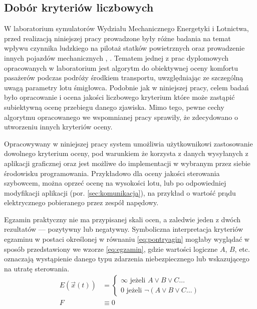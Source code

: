 \subsection{Dobór kryteriów liczbowych}
\label{sec:dobor-kryteriow}
W laboratorium symulatorów Wydziału Mechanicznego Energetyki i Lotnictwa, przed realizacją niniejszej pracy prowadzone były różne badania na temat wpływu czynnika ludzkiego na pilotaż statków powietrznych oraz prowadzenie innych pojazdów mechanicznych \cite{kopyt2017}, \cite{kopyt2019}. Tematem jednej z prac dyplomowych opracowanych w laboratorium \cite{tomaszewska2019} jest algorytm do obiektywnej oceny komfortu pasażerów podczas podróży środkiem transportu, uwzględniając ze szczególną uwagą parametry lotu śmigłowca. Podobnie jak w niniejszej pracy, celem badań było opracowanie i ocena jakości liczbowego kryterium które może zastąpić subiektywną ocenę przebiegu danego zjawiska. Mimo tego, pewne cechy algorytmu opracowanego we wspomnianej pracy sprawiły, że zdecydowano o utworzeniu innych kryteriów oceny.

Opracowywany w niniejszej pracy system umożliwia użytkownikowi zastosowanie dowolnego kryterium oceny, pod warunkiem że korzysta z  danych wysyłanych z aplikacji graficznej oraz jest możliwe do implementacji w wybranym przez siebie środowisku programowania. Przykładowo dla oceny jakości sterowania szybowcem, można oprzeć ocenę na wysokości lotu, lub po odpowiedniej modyfikacji aplikacji (por. \ref{sec:komunikacja}), na przykład o wartość prądu elektrycznego pobieranego przez zespół napędowy.

Egzamin praktyczny nie ma przypisanej skali ocen, a zaledwie jeden z dwóch rezultatów --- pozytywny lub negatywny. Symboliczna interpretacja kryteriów egzaminu w postaci określonej w równaniu \ref{eq:pontryagin} mogłaby wyglądać w sposób przedstawiony we wzorze \ref{eq:egzamin}, gdzie wartości logiczne $ A $, $ B $, etc. oznaczają wystąpienie danego typu zdarzenia niebezpiecznego lub wskazującego na utratę sterowania.
\begin{align}
    \label{eq:egzamin}
    E\left( \vec{x}(t) \right) &=
    \left\{
        \begin{array}{ll}
            \infty \mbox{ jeżeli } A \lor B \lor C \dots \\
            0 \mbox{ jeżeli } \neg ( A \lor B \lor C \dots)
        \end{array}
    \right.
    \\
    F & \equiv 0
\end{align}

